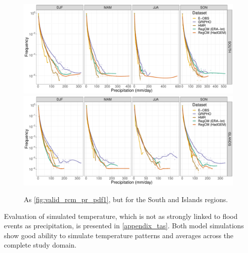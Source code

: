 \afterpage{\clearpage}
\begin{figure}
    \centering
        \includegraphics[width=0.8\textheight]{figures/valid_rcm/pr/pdf_SOUTH_lines}
        \includegraphics[width=0.8\textheight]{figures/valid_rcm/pr/pdf_ISLANDS_lines}
    \decoRule
    \caption[Validation of RegCM precipitation PDFs (2)]{
        As \cref{fig:valid_rcm_pr_pdf1}, but for the South and Islands regions.
    }\label{fig:valid_rcm_pr_pdf2}
\end{figure}

Evaluation of simulated temperature, which is not as strongly linked to flood events as precipitation, is presented in \cref{appendix_tas}.
Both model simulations show good ability to simulate temperature patterns and averages across the complete study domain.


